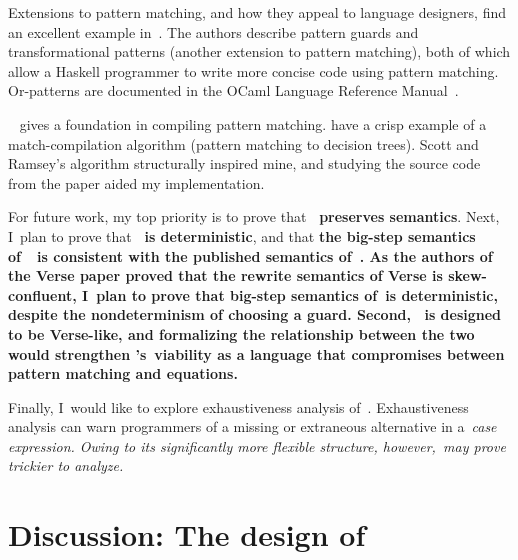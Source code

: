 \documentclass[manuscript,screen 12pt, nonacm]{acmart}
\begin{document}
    Extensions to pattern matching, and how they appeal to language designers,
    find an excellent example in~\citet{guardproposal}. The authors describe
    pattern guards and transformational patterns (another extension to pattern
    matching), both of which allow a Haskell programmer to write more concise
    code using pattern matching. Or-patterns are documented in the OCaml
    Language Reference Manual~\citep{ocaml}.
    
    \citet{augustsson1985compiling}~ gives a foundation in compiling pattern
    matching. \citet{scottramsey} have a crisp example of a match-compilation
    algorithm (pattern matching to decision trees). Scott and Ramsey's algorithm
    structurally inspired mine, and studying the source code from the paper
    aided my implementation. 

    For future work, my top priority is to prove that
    \textbf{\DTran\ preserves semantics}.
    Next, I~plan to prove that
    \textbf{\VMinus~is
    deterministic}, and that \bf{the big-step semantics of~\VMinus~is
    consistent with the published semantics of~\VC.} As the authors of the
    Verse paper proved that the rewrite semantics of Verse is
    skew-confluent, I~plan to prove that big-step semantics of~\VMinus is
    deterministic, despite the nondeterminism of choosing a guard. Second,
    \VMinus~is designed to be Verse-like, and formalizing the relationship
    between the two would strengthen \VMinus's~viability as a
    language that compromises between pattern matching and equations. 

    Finally, I~would like to explore
    exhaustiveness analysis of~\VMinus.
    Exhaustiveness analysis
    can warn programmers of a missing or extraneous alternative in a~\it{case} expression.
    Owing to its significantly more flexible structure,
    however,~\iffibf may prove trickier to analyze.
    
    
    \section{Discussion: The design of \VMinus}        
    \label{futurework}
    
\end{document}
